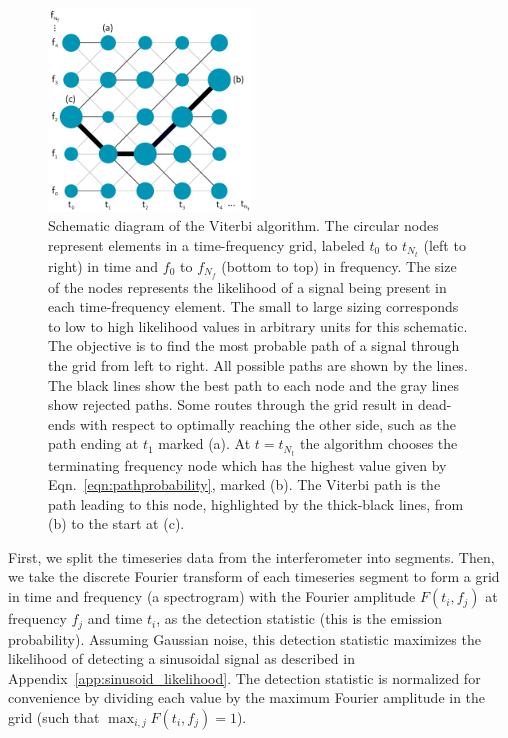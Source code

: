 \documentclass[paper-main.tex]{subfiles}
\begin{document}
\begin{figure}
\begin{center}
\includegraphics[width=0.48\textwidth]{figures/viterbiDiagramSizes.pdf}
\caption{\label{fig:viterbi}
Schematic diagram of the Viterbi algorithm. 
The circular nodes represent elements in a time-frequency grid, labeled $t_0$ to $t_{N_t}$ (left to right) in time and $f_0$ to $f_{N_f}$ (bottom to top) in frequency. 
The size of the nodes represents the likelihood of a signal being present in each time-frequency element. 
The small to large sizing corresponds to low to high likelihood values in arbitrary units for this schematic. 
The objective is to find the most probable path of a signal through the grid from left to right.
All possible paths are shown by the lines. 
The black lines show the best path to each node and the gray lines show rejected paths. 
Some routes through the grid result in dead-ends with respect to optimally reaching the other side, such as the path ending at $t_1$ marked (a).
At $t=t_{N_t}$ the algorithm chooses the terminating frequency node which has the highest value given by Eqn.~\ref{eqn:pathprobability}, marked (b). 
The Viterbi path is the path leading to this node, highlighted by the thick-black lines, from (b) to the start at (c). 
}
\end{center}
\end{figure}


First, we split the timeseries data from the interferometer into segments. 
Then, we take the discrete Fourier transform of each timeseries segment to form a grid in time and frequency (a spectrogram) with the Fourier amplitude $F(t_i,f_j)$ at frequency $f_j$ and time $t_i$, as the detection statistic (this is the emission probability).
Assuming Gaussian noise, this detection statistic maximizes the likelihood of detecting a sinusoidal signal as described in Appendix~\ref{app:sinusoid_likelihood}.
The detection statistic is normalized for convenience by dividing each value by the maximum Fourier amplitude in the grid (such that $\max_{i,j} F(t_i,f_j) = 1$).
\end{document}
